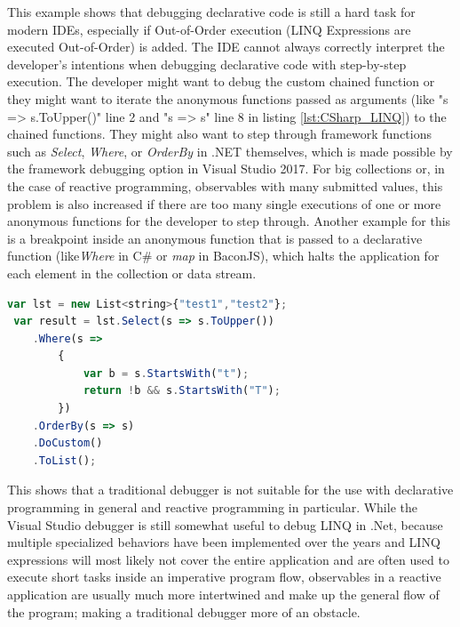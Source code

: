 This example shows that debugging declarative code is still a hard task for modern IDEs, especially if Out-of-Order execution (LINQ Expressions are executed Out-of-Order) is added. The IDE cannot always correctly interpret the developer's intentions when debugging declarative code with step-by-step execution. The developer might want to debug the custom chained function or they might want to iterate the anonymous functions passed as arguments (like "s => s.ToUpper()" line 2 and "s => s" line 8 in listing \ref{lst:CSharp_LINQ}) to the chained functions. They might also want to step through framework functions such as \emph{Select}, \emph{Where}, or \emph{OrderBy} in .NET themselves, which is made possible by the framework debugging option in Visual Studio 2017.
For big collections or, in the case of reactive programming, observables with many submitted values, this problem is also increased if there are too many single executions of one or more anonymous functions for the developer to step through. Another example for this is a breakpoint inside an anonymous function that is passed to a declarative function (like\emph{Where} in C\# or \emph{map} in BaconJS), which halts the application for each element in the collection or data stream.

\begin{lstlisting}[language=JavaScript, caption={Simple example of .NET LINQ in C\# to show the steps the Visual Studio 2017 for .NET debugger takes while debugging step-by-step.},label={lst:CSharp_LINQ}]
 var lst = new List<string>{"test1","test2"};
 var result = lst.Select(s => s.ToUpper())
 	.Where(s =>
 		{
			var b = s.StartsWith("t");
			return !b && s.StartsWith("T");
 		})
	.OrderBy(s => s)
	.DoCustom()
	.ToList();
\end{lstlisting}

This shows that a traditional debugger is not suitable for the use with declarative programming in general and reactive programming in particular. While the Visual Studio debugger is still somewhat useful to debug LINQ in .Net, because multiple specialized behaviors have been implemented over the years and LINQ expressions will most likely not cover the entire application and are often used to execute short tasks inside an imperative program flow, observables in a reactive application are usually much more intertwined and make up the general flow of the program; making a traditional debugger more of an obstacle.

